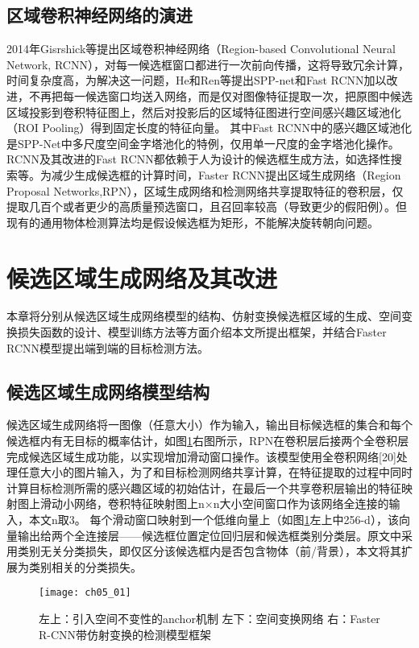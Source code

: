 \subsection{区域卷积神经网络的演进}
2014年Gisrshick等\citep{Girshick2014b}提出区域卷积神经网络（Region-based Convolutional Neural Network, RCNN），对每一候选框窗口都进行一次前向传播，这将导致冗余计算，时间复杂度高，为解决这一问题，He和Ren等提出SPP-net\citep{He2015spp}和Fast RCNN\citep{Girshick2015b}加以改进，不再把每一候选窗口均送入网络，而是仅对图像特征提取一次，把原图中候选区域投影到卷积特征图上，然后对投影后的区域特征图进行空间感兴趣区域池化（ROI Pooling）得到固定长度的特征向量。
其中Fast RCNN中的感兴趣区域池化是SPP-Net中多尺度空间金字塔池化的特例，仅用单一尺度的金字塔池化操作。RCNN及其改进的Fast RCNN都依赖于人为设计的候选框生成方法，如选择性搜索等。为减少生成候选框的计算时间，Faster RCNN提出区域生成网络（Region Proposal Networks,RPN），区域生成网络和检测网络共享提取特征的卷积层，仅提取几百个或者更少的高质量预选窗口，且召回率较高（导致更少的假阳例）。但现有的通用物体检测算法均是假设候选框为矩形，不能解决旋转朝向问题。

\section{候选区域生成网络及其改进}
 
本章将分别从候选区域生成网络模型的结构、仿射变换候选框区域的生成、空间变换损失函数的设计、模型训练方法等方面介绍本文所提出框架，并结合Faster RCNN模型提出端到端的目标检测方法。

\subsection{候选区域生成网络模型结构}

候选区域生成网络将一图像（任意大小）作为输入，输出目标候选框的集合和每个候选框内有无目标的概率估计，如图\ref{fig:ch05_01}右图所示，RPN在卷积层后接两个全卷积层完成候选区域生成功能，以实现增加滑动窗口操作。该模型使用全卷积网络[20]处理任意大小的图片输入，为了和目标检测网络\citep{Girshick2015b}共享计算，在特征提取的过程中同时计算目标检测所需的感兴趣区域的初始估计，在最后一个共享卷积层输出的特征映射图上滑动小网络，卷积特征映射图上n×n大小空间窗口作为该网络全连接的输入，本文n取3。
每个滑动窗口映射到一个低维向量上（如图\ref{fig:ch05_01}左上中256-d），该向量输出给两个全连接层——候选框位置定位回归层和候选框类别分类层。原文中采用类别无关分类损失，即仅区分该候选框内是否包含物体（前/背景），本文将其扩展为类别相关的分类损失。
\begin{figure}[!htbp]
\centering
\texttt{[image: ch05\_01]}
\caption{左上：引入空间不变性的anchor机制 左下：空间变换网络  右：Faster R-CNN带仿射变换的检测模型框架}
\label{fig:ch05_01}
\end{figure}

